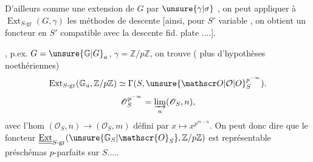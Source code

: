 
D'ailleurs  comme une extension de $G$ par $\unsure{\gamma|\sigma}$ , on peut appliquer à $\operatorname{Ext}_{S\text{-gr}}(G,\gamma)$ les méthodes de descente [ainsi, pour $S'$ variable , on obtient un foncteur en $S'$ compatible avec la descente fid. plate ....].

, p.ex. $G={\unsure{\mathbb G|G}}_a$, $\gamma=\mathbb{Z}/p\mathbb{Z}$, on trouve (   plus d'hypothèses noethériennes)
\[
\operatorname{Ext}_{S\text{-gr}}(\mathbb{G}_a,\mathbb{Z}/p\mathbb{Z})\simeq\Gamma(S,{\unsure{\mathscr O|\mathcal O|O}}_S^{p^{-\infty}}).
\]
\[
\mathscr{O}_S^{p^{-\infty}}=\varinjlim_n(\mathscr{O}_S,n),
\]
avec l'hom $(\mathscr{O}_S,n)\longrightarrow(\mathscr{O}_S,m)$ défini par $x\longmapsto x^{p^{m-n}}$. On peut donc dire que le foncteur $\underline{\underline{\operatorname{Ext}}}_{S\text{-gr}}(\unsure{\mathbb{G}_S|\mathscr{O}_S},\mathbb{Z}/p\mathbb{Z})$ est représentable   préschémas $p$-parfaits sur $S$.....
